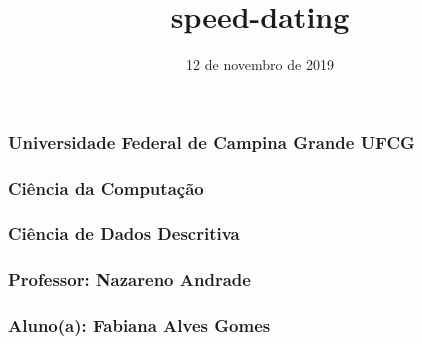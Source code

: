\documentclass[]{article}
\title{speed-dating}
\author{}
\date{12 de novembro de 2019}
\begin{document}
\maketitle

\hypertarget{universidade-federal-de-campina-grande-ufcg}{%
\subsubsection{\texorpdfstring{\textbf{Universidade Federal de Campina
Grande \textbar{}
UFCG}}{Universidade Federal de Campina Grande \textbar{} UFCG}}\label{universidade-federal-de-campina-grande-ufcg}}

\hypertarget{ciuxeancia-da-computauxe7uxe3o}{%
\subsubsection{\texorpdfstring{\textbf{Ciência da Computação
}}{Ciência da Computação }}\label{ciuxeancia-da-computauxe7uxe3o}}

\hypertarget{ciuxeancia-de-dados-descritiva}{%
\subsubsection{\texorpdfstring{\textbf{Ciência de Dados
Descritiva}}{Ciência de Dados Descritiva}}\label{ciuxeancia-de-dados-descritiva}}

\hypertarget{professor-nazareno-andrade}{%
\subsubsection{\texorpdfstring{\textbf{Professor}: Nazareno
Andrade}{Professor: Nazareno Andrade}}\label{professor-nazareno-andrade}}

\hypertarget{alunoa-fabiana-alves-gomes}{%
\subsubsection{\texorpdfstring{\textbf{Aluno(a)}: Fabiana Alves
Gomes}{Aluno(a): Fabiana Alves Gomes}}\label{alunoa-fabiana-alves-gomes}}
\end{document}
